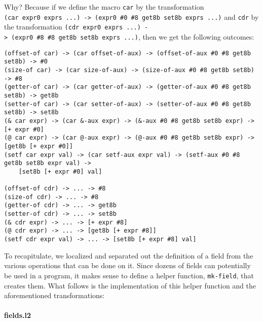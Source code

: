 \documentclass[]{article}
\let\oldparagraph\paragraph
\renewcommand{\paragraph}[1]{\oldparagraph{#1}\mbox{}}
\begin{document}
Why? Because if we define the macro \texttt{car} by the transformation
\texttt{(car\ expr0\ exprs\ ...)\ -\textgreater{}\ (expr0\ \#0\ \#8\ get8b\ set8b\ exprs\ ...)}
and \texttt{cdr} by the transformation
\texttt{(cdr\ expr0\ exprs\ ...)\ -\textgreater{}\ (expr0\ \#8\ \#8\ get8b\ set8b\ exprs\ ...)},
then we get the following outcomes:

\begin{verbatim}
(offset-of car) -> (car offset-of-aux) -> (offset-of-aux #0 #8 get8b set8b) -> #0
(size-of car) -> (car size-of-aux) -> (size-of-aux #0 #8 get8b set8b) -> #8
(getter-of car) -> (car getter-of-aux) -> (getter-of-aux #0 #8 get8b set8b) -> get8b
(setter-of car) -> (car setter-of-aux) -> (setter-of-aux #0 #8 get8b set8b) -> set8b
(& car expr) -> (car &-aux expr) -> (&-aux #0 #8 get8b set8b expr) -> [+ expr #0]
(@ car expr) -> (car @-aux expr) -> (@-aux #0 #8 get8b set8b expr) -> [get8b [+ expr #0]]
(setf car expr val) -> (car setf-aux expr val) -> (setf-aux #0 #8 get8b set8b expr val) ->
    [set8b [+ expr #0] val]

(offset-of cdr) -> ... -> #8
(size-of cdr) -> ... -> #8
(getter-of cdr) -> ... -> get8b
(setter-of cdr) -> ... -> set8b
(& cdr expr) -> ... -> [+ expr #8]
(@ cdr expr) -> ... -> [get8b [+ expr #8]]
(setf cdr expr val) -> ... -> [set8b [+ expr #8] val]
\end{verbatim}

To recapitulate, we localized and separated out the definition of a
field from the various operations that can be done on it. Since dozens
of fields can potentially be used in a program, it makes sense to define
a helper function, \texttt{mk-field}, that creates them. What follows is
the implementation of this helper function and the aforementioned
transformations:

\hypertarget{fields.l2}{%
\paragraph{fields.l2}\label{fields.l2}}
\end{document}
